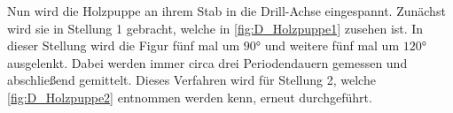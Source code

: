 \begin{figure}
\begin{subfigure}{0.48\textwidth}
    \end{subfigure}    
\end{figure}

Nun wird die Holzpuppe an ihrem Stab in die Drill-Achse eingespannt. Zunächst wird sie in Stellung 1 gebracht, welche in \autoref{fig:D_Holzpuppe1} zusehen ist. In dieser Stellung wird die Figur fünf 
mal um $90\unit{\degree}$ und weitere fünf mal um $120\unit{\degree}$ ausgelenkt. Dabei werden immer circa drei Periodendauern gemessen und abschließend gemittelt. Dieses Verfahren wird für 
Stellung 2, welche \autoref{fig:D_Holzpuppe2} entnommen werden kenn, erneut durchgeführt. 
